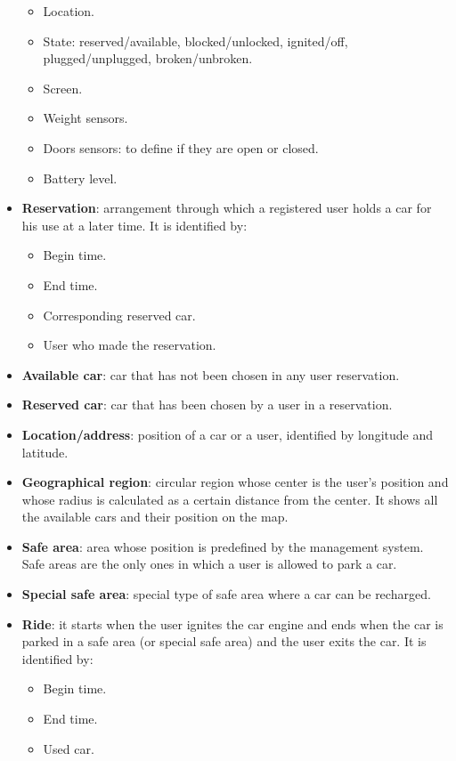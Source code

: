 \begin{itemize}
	\begin{itemize}
		\item Location.
		\item State: reserved/available, blocked/unlocked, ignited/off, plugged/unplugged, broken/unbroken.
		\item Screen.
		\item Weight sensors.
		\item Doors sensors: to define if they are open or closed.
		\item Battery level. 
	\end{itemize}
	\item \textbf{Reservation}: arrangement through which a registered user holds a car for his use at a later time. It is identified by:
	\begin{itemize}
		\item Begin time.
		\item End time.
		\item Corresponding reserved car.
		\item User who made the reservation.
	\end{itemize}
	\item \textbf{Available car}: car that has not been chosen in any user reservation.
	\item \textbf{Reserved car}: car that has been chosen by a user in a reservation. 
	\item \textbf{Location/address}: position of a car or a user, identified by longitude and latitude. 
	\item \textbf{Geographical region}: circular region whose center is the user's position and whose radius is calculated as a certain distance from the center. It shows all the available cars and their position on the map. 
	\item \textbf{Safe area}: area whose position is predefined by the management system. Safe areas are the only ones in which a user is allowed to park a car. 
	\item \textbf{Special safe area}: special type of safe area where a car can be recharged.
	\newpage
	\item \textbf{Ride}: it starts when the user ignites the car engine and ends when the car is parked in a safe area (or special safe area) and the user exits the car. It is identified by: 
	\begin{itemize}
		\item Begin time.
		\item End time.
		\item Used car.

\end{itemize}
\end{itemize}
